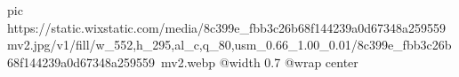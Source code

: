  
 
 
 
 

\ifcmt
  pic https://static.wixstatic.com/media/8c399e_fbb3c26b68f144239a0d67348a259559~mv2.jpg/v1/fill/w_552,h_295,al_c,q_80,usm_0.66_1.00_0.01/8c399e_fbb3c26b68f144239a0d67348a259559~mv2.webp
  @width 0.7
  @wrap center
\fi
